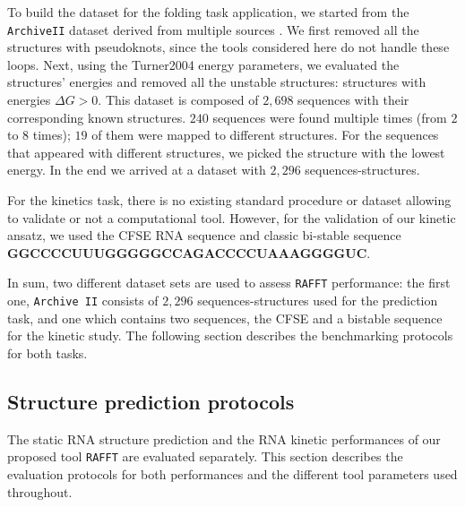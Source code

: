 To build the dataset for the folding task application, we started from the \texttt{ArchiveII} dataset derived from multiple sources \cite{andronescu08_rna_stran,brown98_ribon_p_datab,bellaousov10_probk,daub08_rna_wikip,damberger94_compar_datab_group_i_intron_struc,zwieb00_tmrdb,zwieb03_tmrdb,waring84_asses_model_intron_rna_secon,specht97_compil_rrna_rrna_gene_sequen,sprinzl98_compil_trna_sequen_sequen_trna_genes,sloma16_exact_calcul_loop_format_probab,schnare96_compr_compar_struc_charac_eukar,mathews99_expan_sequen_depen_therm_param,samuelsson99_signal_recog_partic_datab_srpdb,gutell93_compil_large_subun_like_ribos_rna_struc,gutell94_collec_small_subun_like_ribos_rna_struc,gardner09_rfam}. We first removed all the structures with pseudoknots, since the tools considered here do not handle these loops. Next, using the Turner2004 energy parameters, we evaluated the structures' energies and removed all the unstable structures: structures with energies $\Delta G > 0$. This dataset is composed of $2,698$ sequences with their corresponding known structures. $240$ sequences were found multiple times (from $2$ to $8$ times); $19$ of them were mapped to different structures. For the sequences that appeared with different structures, we picked the structure with the lowest energy. In the end we arrived at a dataset with $2,296$ sequences-structures.

For the kinetics task, there is no existing standard procedure or dataset allowing to validate or not a computational tool. However, for the validation of our kinetic ansatz, we used the \ac{CFSE} \ac{RNA} sequence and classic bi-stable sequence \textbf{GGCCCCUUUGGGGGCCAGACCCCUAAAGGGGUC}. 

In sum, two different dataset sets are used to assess \texttt{RAFFT} performance: the first one,  \texttt{Archive II}  consists of $2,296$ sequences-structures used for the prediction task, and one which contains two sequences, the CFSE and a bistable sequence for the kinetic study. The following section describes the benchmarking protocols for both tasks. 

\subsection{Structure prediction protocols}
The static RNA structure prediction and the  RNA kinetic performances of our proposed tool \texttt{RAFFT} are evaluated separately. This section describes the evaluation protocols for both performances and the different tool parameters used throughout.

